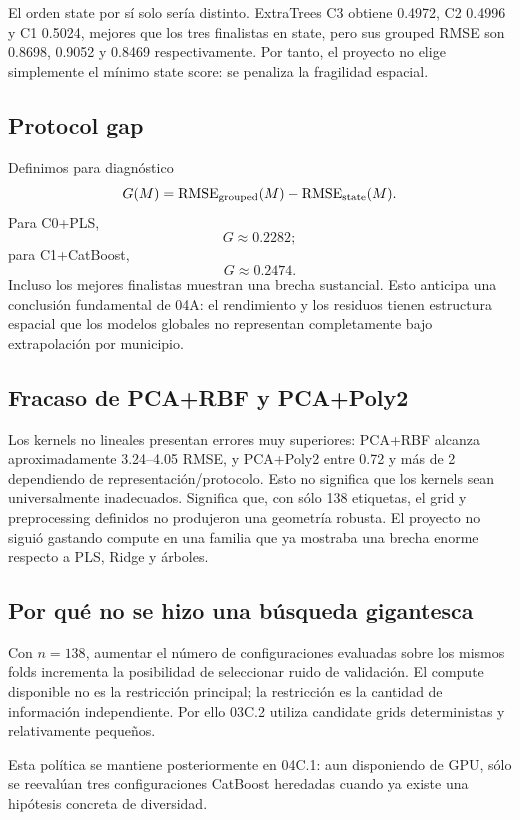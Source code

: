El orden state por sí solo sería distinto. ExtraTrees C3 obtiene 0.4972, C2 0.4996 y C1
0.5024, mejores que los tres finalistas en state, pero sus grouped RMSE son 0.8698, 0.9052 y
0.8469 respectivamente. Por tanto, el proyecto no elige simplemente el mínimo state score:
se penaliza la fragilidad espacial.

\subsection{Protocol gap}

Definimos para diagnóstico
\[
G(M)=
\operatorname{RMSE}_{\mathrm{grouped}}(M)
-
\operatorname{RMSE}_{\mathrm{state}}(M).
\]
Para C0+PLS,
\[
G\approx0.2282;
\]
para C1+CatBoost,
\[
G\approx0.2474.
\]
Incluso los mejores finalistas muestran una brecha sustancial. Esto anticipa una conclusión
fundamental de 04A: el rendimiento y los residuos tienen estructura espacial que los modelos
globales no representan completamente bajo extrapolación por municipio.

\subsection{Fracaso de PCA+RBF y PCA+Poly2}

Los kernels no lineales presentan errores muy superiores: PCA+RBF alcanza aproximadamente
3.24--4.05 RMSE, y PCA+Poly2 entre 0.72 y más de 2 dependiendo de representación/protocolo.
Esto no significa que los kernels sean universalmente inadecuados. Significa que, con sólo 138
etiquetas, el grid y preprocessing definidos no produjeron una geometría robusta. El proyecto
no siguió gastando compute en una familia que ya mostraba una brecha enorme respecto a PLS,
Ridge y árboles.

\subsection{Por qué no se hizo una búsqueda gigantesca}

Con $n=138$, aumentar el número de configuraciones evaluadas sobre los mismos folds incrementa
la posibilidad de seleccionar ruido de validación. El compute disponible no es la restricción
principal; la restricción es la cantidad de información independiente. Por ello 03C.2 utiliza
candidate grids deterministas y relativamente pequeños.

Esta política se mantiene posteriormente en 04C.1: aun disponiendo de GPU, sólo se reevalúan
tres configuraciones CatBoost heredadas cuando ya existe una hipótesis concreta de diversidad.

